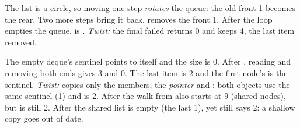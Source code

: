The list is a circle, so moving  one step \emph{rotates} the queue: the old front
1 becomes the rear. Two more steps bring it back.  removes the front 1. After the
loop empties the queue,  is . \emph{Twist:} the final failed 
returns 0 and  keeps 4, the last item removed.

The empty deque's sentinel points to itself and the size is 0.
After , reading and removing both ends gives 3 and 0. The last item is 2 and
the first node's  is the sentinel. \emph{Twist:}  copies
only the members, the \emph{pointer}  and : both objects use the
same sentinel (1) and  is 2. After  the walk from
 also starts at 9 (shared nodes), but  is still 2. After
 the shared list is empty (the last 1), yet  still says 2: a
shallow copy goes out of date.
